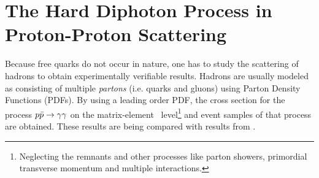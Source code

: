 \chapter{The Hard Diphoton Process in Proton-Proton
  Scattering}%
\label{chap:pdf}

Because free quarks do not occur in nature, one has to study the
scattering of hadrons to obtain experimentally verifiable
results. Hadrons are usually modeled as consisting of multiple
\emph{partons} (i.e. quarks and gluons) using Parton Density Functions
(PDFs). By using a leading order PDF, the cross section for the
process \(p\bar{p}\rightarrow\gamma\gamma\) on the matrix-element~\cite[14]{buckley:2011ge}
level\footnote{Neglecting the remnants and other processes like parton
  showers, primordial transverse momentum and multiple interactions.}
and event samples of that process are obtained. These results are
being compared with results from \sherpa.

